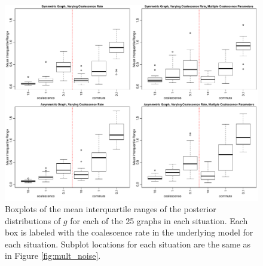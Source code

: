\documentclass{article}
\begin{document}
\begin{figure}
\centering
\includegraphics[scale=.6]{figs/mult_gam_iqr}
\caption{Boxplots of the mean interquartile ranges of the posterior distributions of $g$
for each of the 25 graphs in each situation.
Each box is labeled with the coalescence rate in the underlying model for each situation.
Subplot locations for each situation are the same as in Figure \ref{fig:mult_noise}.
}
\label{fig:mult_gam_iqr}
\end{figure}
\end{document}
